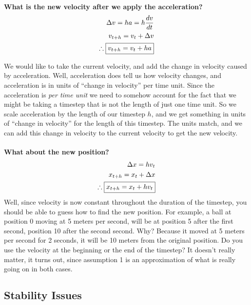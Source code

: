 \documentclass[]{article}
\begin{document}
\paragraph{}

\textbf{What is the new velocity after we apply the acceleration?} 
\begin{eqnarray}
	\Delta v = h a = h \frac{dv}{dt}\\
	v_{t+h} = v_{t} + \Delta v \\
	\therefore \fbox{$v_{t+h} = v_t + ha$} \label{velupdate}
\end{eqnarray}

We would like to take the current velocity, and add the change in velocity caused by acceleration. Well, acceleration does tell us how velocity changes, and acceleration is in units of ``change in velocity'' per time unit. Since the acceleration is \emph{per time unit} we need to somehow account for the fact that we might be taking a timestep that is not the length of just one time unit. So we scale acceleration by the length of our timestep $h$, and we get something in units of ``change in velocity'' for the length of this timestep. The units match, and we can add this change in velocity to the current velocity to get the new velocity.

\paragraph{}

\textbf{What about the new position?} 
\begin{eqnarray}
	\Delta x = h v_t \\
	x_{t + h} = x_t + \Delta x \\
	\therefore \fbox{$x_{t + h} = x_t + h v_t$} \label{posupdate} %
\end{eqnarray}
Well, since velocity is now constant throughout the duration of the timestep, you should be able to guess how to find the new position. For example, a ball at position 0 moving at 5 meters per second, will be at position 5 after the first second, position 10 after the second second. Why? Because it moved at 5 meters per second for 2 seconds, it will be 10 meters from the original position. Do you use the velocity at the beginning or the end of the timestep? It doesn't really matter, it turns out, since assumption 1 is an approximation of what is really going on in both cases.

\subsection{Stability Issues}
\end{document}
